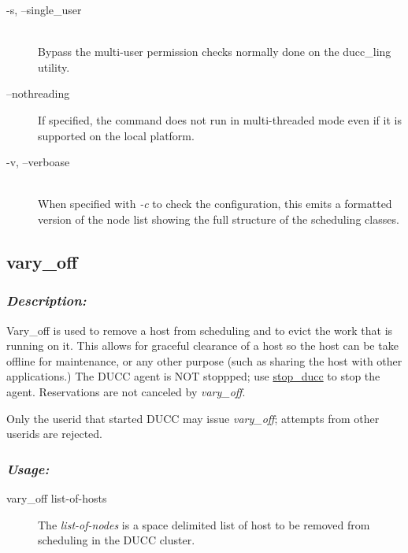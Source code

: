 \begin{description}
            \item[-s, --single\_user] \hfill \\
              Bypass the multi-user permission checks normally done on the ducc\_ling utility.
              
            \item[--nothreading] If specified, the command does not run in multi-threaded mode
              even if it is supported on the local platform.

            \item[-v, --verboase] \hfill \\
              When specified with {\em -c} to check the configuration, this emits a formatted version
              of the node list showing the full structure of the scheduling classes.
              

           \end{description}               
       
\subsection{vary\_off}
\label{subsec:admin.vary-off}
    \subsubsection{{\em Description:}}

    Vary\_off is used to remove a host from scheduling and to evict the work that is running on it.
    This allows for graceful clearance of a host so the host can be take offline for maintenance,
    or any other purpose (such as sharing the host with other applications.)  The DUCC agent
    is NOT stoppped; use 
    \hyperref[subsec:admin.stop-ducc]{stop\_ducc} to stop the agent.  Reservations are not 
    canceled by {\em vary\_off}.
    
    Only the userid that started DUCC may issue {\em vary\_off}; attempts from other userids
    are rejected.

    \subsubsection{\em{Usage: }}

        \begin{description} 
          \item[vary\_off list-of-hosts]
            The {\em list-of-nodes} is a space delimited list of host to be removed from
              scheduling in the DUCC cluster.
        \end{description}
            
